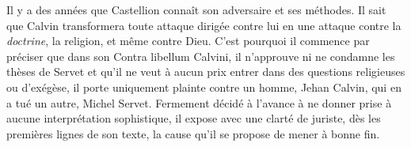 \documentclass[french,twoside]{book} %
\newcommand{\astermono}{\medskip\centerline{\color{rubric}\large\selectfont{\syms ✻}}\medskip\par}%
\begin{document}
\astermono

\noindent Il y a des années que Castellion connaît son adversaire et ses méthodes. Il sait que Calvin transformera toute attaque dirigée contre lui en une attaque contre la \emph{doctrine}, la religion, et même contre Dieu. C’est pourquoi il commence par préciser que dans son Contra libellum Calvini, il n’approuve ni ne condamne les thèses de Servet et qu’il ne veut à aucun prix entrer dans des questions religieuses ou d’exégèse, il porte uniquement plainte contre un homme, Jehan Calvin, qui en a tué un autre, Michel Servet. Fermement décidé à l’avance à ne donner prise à aucune interprétation sophistique, il expose avec une clarté de juriste, dès les premières lignes de son texte, la cause qu’il se propose de mener à bonne fin.\par
\end{document}
